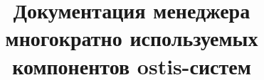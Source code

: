 \documentclass{scndocument}
\begin{document}
	
	
	\DeactivateBG
	\title{\centering
		Документация менеджера многократно используемых компонентов ostis-систем}
	\maketitle
	
	\normalsize
	
	\setcounter{page}{2}
	
	\ActivateBG
	\begin{SCn}
		
		
	\end{SCn}
\end{document}
